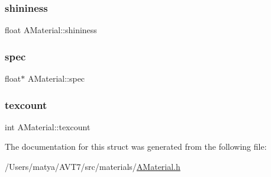 \mbox{\label{struct_a_material_a392b66356673ad7beb4964a353c93429}} 
\subsubsection{\texorpdfstring{shininess}{shininess}}
{\footnotesize\ttfamily float A\+Material\+::shininess}

\mbox{\label{struct_a_material_a34adf01d2a83a57f707a4e1f230f3aa9}} 
\subsubsection{\texorpdfstring{spec}{spec}}
{\footnotesize\ttfamily float$\ast$ A\+Material\+::spec}

\mbox{\label{struct_a_material_a188a4f0c36c5a95beaa4d99f38ee098f}} 
\subsubsection{\texorpdfstring{texcount}{texcount}}
{\footnotesize\ttfamily int A\+Material\+::texcount}



The documentation for this struct was generated from the following file\+:\begin{DoxyCompactItemize}
\item 
/\+Users/matya/\+A\+V\+T7/src/materials/\hyperlink{_a_material_8h}{A\+Material.\+h}\end{DoxyCompactItemize}

